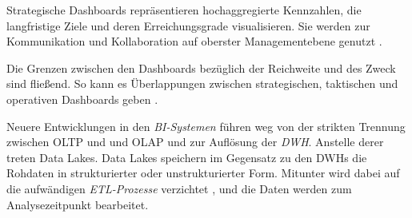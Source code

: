 Strategische Dashboards repräsentieren hochaggregierte Kennzahlen, die langfristige Ziele und deren Erreichungsgrade visualisieren. 
Sie werden zur Kommunikation und Kollaboration auf oberster Managementebene genutzt \cite[vgl.][155 f.]{linden_geschaftsmodellbasierte_2016}. 


Die Grenzen zwischen den Dashboards bezüglich der Reichweite und des Zweck sind fließend. 
So kann es Überlappungen zwischen strategischen, taktischen und operativen Dashboards geben \cite[vgl.][121]{eckerson_performance_2011}.


Neuere Entwicklungen in den \textit{\acrshort{BI}-Systemen} führen weg von der strikten Trennung zwischen \acrshort{OLTP} und und \acrshort{OLAP} und zur Auflösung der \textit{\acrshort{DWH}}. 
Anstelle derer treten Data Lakes. Data Lakes speichern im Gegensatz zu den \acrlong{DWH}s die Rohdaten in strukturierter oder unstrukturierter Form. 
Mitunter wird dabei auf die aufwändigen \textit{\acrshort{ETL}-Prozesse} verzichtet \cite[vgl.][86]{gronwald_integrierte_2020}, und die Daten werden zum Analysezeitpunkt bearbeitet.









